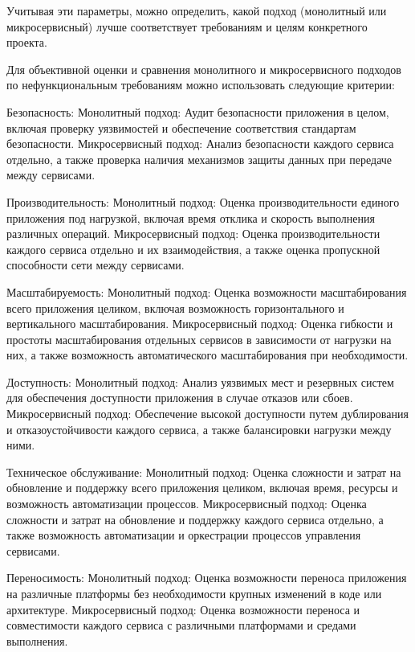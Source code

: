 Учитывая эти параметры, можно определить, какой подход (монолитный или микросервисный) лучше соответствует требованиям и целям конкретного проекта.

Для объективной оценки и сравнения монолитного и микросервисного подходов по нефункциональным требованиям можно использовать следующие критерии:

    Безопасность:
        Монолитный подход: Аудит безопасности приложения в целом, включая проверку уязвимостей и обеспечение соответствия стандартам безопасности.
        Микросервисный подход: Анализ безопасности каждого сервиса отдельно, а также проверка наличия механизмов защиты данных при передаче между сервисами.

    Производительность:
        Монолитный подход: Оценка производительности единого приложения под нагрузкой, включая время отклика и скорость выполнения различных операций.
        Микросервисный подход: Оценка производительности каждого сервиса отдельно и их взаимодействия, а также оценка пропускной способности сети между сервисами.

    Масштабируемость:
        Монолитный подход: Оценка возможности масштабирования всего приложения целиком, включая возможность горизонтального и вертикального масштабирования.
        Микросервисный подход: Оценка гибкости и простоты масштабирования отдельных сервисов в зависимости от нагрузки на них, а также возможность автоматического масштабирования при необходимости.

    Доступность:
        Монолитный подход: Анализ уязвимых мест и резервных систем для обеспечения доступности приложения в случае отказов или сбоев.
        Микросервисный подход: Обеспечение высокой доступности путем дублирования и отказоустойчивости каждого сервиса, а также балансировки нагрузки между ними.

    Техническое обслуживание:
        Монолитный подход: Оценка сложности и затрат на обновление и поддержку всего приложения целиком, включая время, ресурсы и возможность автоматизации процессов.
        Микросервисный подход: Оценка сложности и затрат на обновление и поддержку каждого сервиса отдельно, а также возможность автоматизации и оркестрации процессов управления сервисами.

    Переносимость:
        Монолитный подход: Оценка возможности переноса приложения на различные платформы без необходимости крупных изменений в коде или архитектуре.
        Микросервисный подход: Оценка возможности переноса и совместимости каждого сервиса с различными платформами и средами выполнения.

